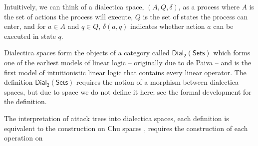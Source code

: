 \documentclass{llncs}
\newcommand{\dial}[0]{\mathsf{Dial_2}(\mathsf{Sets})}
\begin{document}
Intuitively, we can think of a dialectica space, $(A , Q, \delta)$, as
a process where $A$ is the set of actions the process will execute,
$Q$ is the set of states the process can enter, and for $a \in A$ and
$q \in Q$, $\delta(a , q)$ indicates whether action $a$ can be
executed in state $q$.  

Dialectica spaces form the objects of a category called $\dial$ which
forms one of the earliest models of linear logic -- originally due to
de Paiva \cite{dePaiva:1987} -- and is the first model of
intuitionistic linear logic that contains every linear operator.  The
definition $\dial$ requires the notion of a morphism between
dialectica spaces, but due to space we do not define it here; see the
formal development for the definition.

The interpretation of attack trees into dialectica spaces, each
definition is equivalent to the construction on Chu spaces
\cite{Gupta:1994}, requires the construction of each operation on
\end{document}
